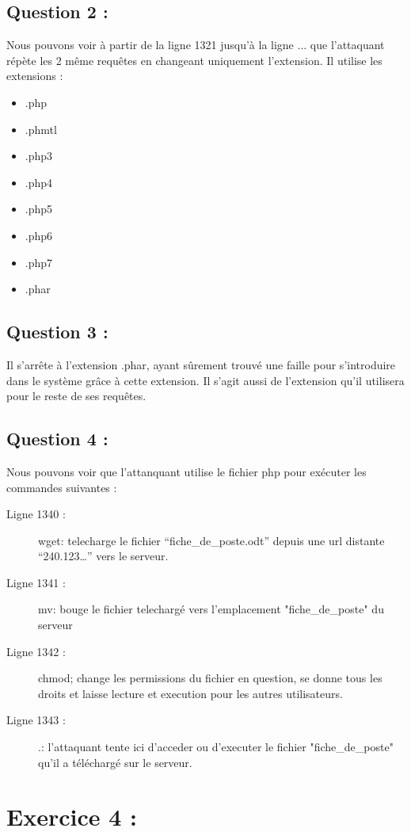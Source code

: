 \documentclass{article}
\begin{document}
    \subsection{Question 2 :}
        Nous pouvons voir à partir de la ligne 1321 jusqu'à la ligne ... que l'attaquant répète les 2 même requêtes en changeant uniquement l'extension.
        Il utilise les extensions :
        \begin{itemize}
            \item .php
            \item .phmtl
            \item .php3
            \item .php4
            \item .php5
            \item .php6
            \item .php7
            \item .phar
        \end{itemize}
    \subsection{Question 3 :}
        Il s'arrête à l'extension .phar, ayant sûrement trouvé une faille pour s'introduire dans le système grâce à cette extension.
        Il s'agit aussi de l'extension qu'il utilisera pour le reste de ses requêtes.
    \subsection{Question 4 :}
        Nous pouvons voir que l'attanquant utilise le fichier php pour exécuter les commandes suivantes :
        \begin{description}
            \item[Ligne 1340 :] wget: telecharge le fichier “fiche\_de\_poste.odt” depuis une url distante “240.123…” vers le serveur.
            \item[Ligne 1341 :] mv: bouge le fichier telechargé vers l’emplacement "fiche\_de\_poste" du serveur
            \item[Ligne 1342 :] chmod; change les permissions du fichier en question, se donne tous les droits et laisse lecture et execution pour les autres utilisateurs.
            \item[Ligne 1343 :] .\/: l’attaquant tente ici d’acceder ou d’executer le fichier "fiche\_de\_poste" qu’il a téléchargé sur le serveur.
        \end{description}
\section{Exercice 4 :}
\end{document}
